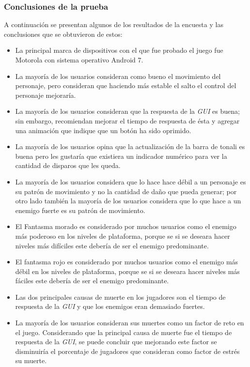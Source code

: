 \subsubsection{Conclusiones de la prueba}
A continuación se presentan algunos de los resultados de la encuesta y las
conclusiones que se obtuvieron de estos:
\begin{itemize}
        \item La principal marca de dispositivos con el que fue probado el juego fue
        Motorola con sistema operativo Android 7.
        \item La mayoría de los usuarios consideran como bueno el movimiento del
        personaje, pero consideran que haciendo más estable el salto el control del
        personaje mejoraría.
        \item La mayoría de los usuarios consideran que la respuesta de la
        \textit{GUI} es buena; sin embargo, recomiendan mejorar el tiempo de respuesta
        de ésta y agregar una animación que indique que un botón ha sido oprimido.
        \item La mayoría de los usuarios opina que la actualización de la barra de
        tonali es buena pero les gustaría que existiera un indicador numérico para ver
        la cantidad de disparos que les queda.
        \item La mayoría de los usuarios considera que lo hace hace débil a un personaje
        es su patrón de movimiento y no la cantidad de daño que pueda generar; por
        otro lado también la mayoría de los usuarios considera que lo que hace a un
        enemigo fuerte es su patrón de movimiento.
        \item El Fantasma morado es considerado por muchos usuarios como el enemigo más
        poderoso en los niveles de plataforma, porque se si se deseara hacer niveles
        más difíciles este debería de ser el enemigo predominante.
        \item El fantasma rojo es considerado por muchos usuarios como el enemigo más
        débil en los niveles de plataforma, porque se si se deseara hacer niveles
        más fáciles este debería de ser el enemigo predominante.
        \item Las dos principales causas de muerte en los jugadores son el tiempo
        de respuesta de la \textit{GUI} y que los enemigos eran demasiado fuertes.
        \item La mayoría de los usuarios consideran sus muertes como un factor de reto
        en el juego. Considerando que la principal causa de muerte fue el tiempo de
        respuesta de la \textit{GUI}, se puede concluir que mejorando este factor se
        disminuiría el porcentaje de jugadores que consideran como factor de estrés su
        muerte.
\end{itemize}
